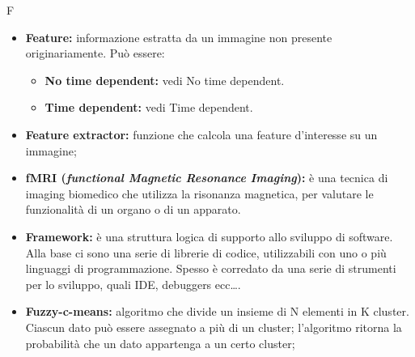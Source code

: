 \Huge F
\normalsize
\begin{itemize}
\item\textbf{Feature:} informazione estratta da un immagine non presente originariamente. Può essere:
\begin{itemize}
\item\textbf{No time dependent:} vedi No time dependent\glossario{}.
\item\textbf{Time dependent:} vedi Time dependent\glossario{}.
\end{itemize}

\item\textbf{Feature extractor:} funzione che calcola una feature\glossario{} d'interesse su un immagine;

\item\textbf{fMRI (\textit{functional Magnetic Resonance Imaging}):} è una tecnica di imaging biomedico\glossario{} che utilizza la risonanza magnetica, per valutare le funzionalità di un organo o di un apparato.

\item\textbf{Framework:} è una struttura logica di supporto allo sviluppo di software. Alla base ci sono una serie di librerie di codice, utilizzabili con uno o più linguaggi di programmazione. Spesso è corredato da una serie di strumenti per lo sviluppo, quali IDE\glossario{}, debuggers ecc\dots .

\item\textbf{Fuzzy-c-means:} algoritmo che divide un insieme di N elementi in K cluster. Ciascun dato può essere assegnato a più di un cluster; l'algoritmo ritorna la probabilità che un dato appartenga a un certo cluster; 
\end{itemize}
\pagebreak


